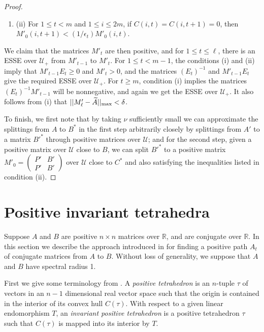 \documentclass{amsart}
\theoremstyle{definition}
\theoremstyle{remark}
\numberwithin{equation}{section}
\begin{document}
{{\begin{proof}
\begin{enumerate}
\item[] (ii)
For $1\leq  t< m$ and $1\leq i \leq 2m$,  if 
$C(i,t)=C(i,t+1)=0$, then 
$M'_0(i,t+1)< (1/\epsilon_t)M'_0(i,t)$.
\end{enumerate} 
We claim that the matrices $M'_t$ are then positive, 
and for $1\leq t\leq \ell$, there is an ESSE over $\mathcal U_+$ 
from $M'_{t-1}$ to $M'_{t}$. 
For $1\leq t <m-1$, the conditions 
(i) and (ii) imply that 
$M'_{t-1}E_t\geq 0$ and 
$M'_t>0$, and the matrices 
 $(E_t)^{-1}$ and  $M'_{t-1}E_t$ give the required ESSE 
over $\mathcal U_+$.
For $t\geq m$, condition (i) 
implies the matrices 
$(E_t)^{-1}M'_{t-1}$ will be nonnegative, 
and again we get the ESSE over $\mathcal U_+$. 
It also follows from (i) that 
$||M_{\ell}'-\widetilde A||_{\textnormal{max}}<\delta$.

To finish, we 
first note  that by taking $\nu$ sufficiently small we can approximate 
the splittings from $A$ to $B^*$ in the first step
arbitrarily closely  by splittings 
from $A'$ to a matrix $B'^*$ through 
positive matrices over $\mathcal U$; and for the second 
step, 
given a positive matrix over $\mathcal U$ close to $B$, 
we can split $B'^*$  to a positive matrix 
$M'_0=
\left(
\begin{smallmatrix} P' & B'  \\ P' & B' 
\end{smallmatrix}
\right)$
over $\mathcal U$ close to $C^*$ and also satisfying the 
inequalities listed in condition (ii). 
\end{proof}

\section{Positive invariant tetrahedra}\label{tetrahedrasec}

Suppose $A$ and $B$ are positive  $n\times n$ matrices over 
$\mathbb R$, and are conjugate over $\mathbb R$.  
In this section we describe the 
approach introduced in \cite{KR2} 
for finding a positive path $A_t$  of conjugate matrices 
from $A$ to $B$. 
Without loss of generality, we suppose that $A$ and $B$ 
have spectral radius 1.  

First we give some terminology from \cite{KR2}. 
A {\it positive tetrahedron} is 
an $n$-tuple $\tau$ of vectors 
in an $n-1$ dimensional 
real vector space
such that the origin 
is contained in the interior of 
its  convex hull $C(\tau )$. With respect to a given 
linear endomorphism $T$, an 
{\it invariant positive tetrahedron} is a positive 
tetrahedron $\tau$ such that $C(\tau )$ is mapped into 
its interior by $T$. 

}}
\end{document}

